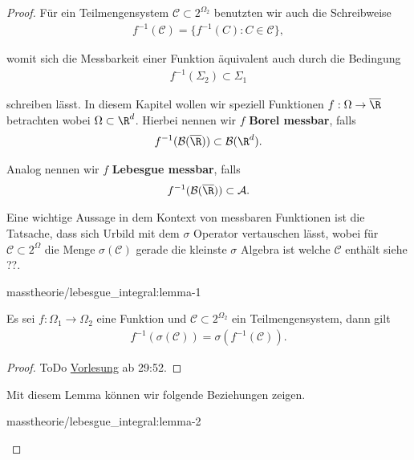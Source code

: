 \documentclass[letterpaper,10pt,english]{jupyterBook}
\begin{document}
\begin{proof}
\par
Für ein Teilmengensystem \(\mathcal{C}\subset 2^{\Omega_2}\) benutzten wir auch die Schreibweise
\begin{align*}
f^{-1}(\mathcal{C}) = \{ f^{-1}(C): C\in\mathcal{C}\},
\end{align*}
\par
womit sich die Messbarkeit einer Funktion äquivalent auch durch die Bedingung
\begin{align*}
f^{-1}(\Sigma_2)\subset\Sigma_1
\end{align*}
\par
schreiben lässt. In diesem Kapitel wollen wir speziell Funktionen \(f:\Omega\to\overline{\R}\) betrachten wobei \(\Omega\subset\R^d\). Hierbei nennen wir \(f\) \textbf{Borel messbar}, falls
\begin{align*}
f^{-1}(\mathcal{B}(\overline{\R}))\subset \mathcal{B}(\R^d).
\end{align*}
\par
Analog nennen wir \(f\) \textbf{Lebesgue messbar}, falls
\begin{align*}
f^{-1}(\mathcal{B}(\overline{\R}))\subset \mathcal{A}.
\end{align*}
\par
Eine wichtige Aussage in dem Kontext von messbaren Funktionen ist die Tatsache, dass sich Urbild mit dem \(\sigma\) Operator vertauschen lässt, wobei für \(\mathcal{C}\subset 2^\Omega\) die Menge \(\sigma(\mathcal{C})\) gerade die kleinste \(\sigma\) Algebra ist welche \(\mathcal{C}\) enthält siehe ??.
\begin{lemma}{}{masstheorie/lebesgue_integral:lemma-1}



\par
Es sei \(f:\Omega_1\to\Omega_2\) eine Funktion und \(\mathcal{C}\subset 2^{\Omega_2}\) ein Teilmengensystem, dann gilt
\begin{align*}
f^{-1}(\sigma(\mathcal{C})) = \sigma(f^{-1}(\mathcal{C})).
\end{align*}\end{lemma}

\begin{proof}
 ToDo
\href{https://www.fau.tv/clip/id/40563}{Vorlesung} ab 29:52.
\end{proof}

\par
Mit diesem Lemma können wir folgende Beziehungen zeigen.
\begin{lemma}{}{masstheorie/lebesgue_integral:lemma-2}



\end{lemma}
\end{proof}
\end{document}
